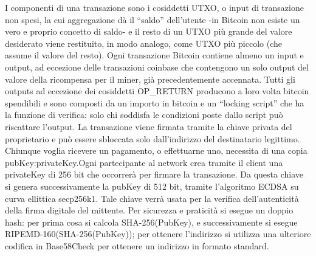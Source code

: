 \begin{table}[ht]
	\centering
\caption{Struttura dell'header di una transazione Bitcoin (Mastering Bitcoin)}
\end{table}


I componenti di una transazione sono i cosiddetti UTXO, o input di transazione non spesi, la cui aggregazione dà il “saldo” dell’utente -in Bitcoin non esiste un vero e proprio concetto di saldo- e il resto di un UTXO più grande del valore desiderato viene restituito, in modo analogo, come UTXO più piccolo (che assume il valore del resto). 
Ogni transazione Bitcoin contiene almeno un input e output, ad eccezione delle transazioni coinbase che contengono un solo output del valore della ricompensa per il miner, già precedentemente accennata. Tutti gli outputs ad eccezione dei cosiddetti OP\_RETURN producono a loro volta bitcoin spendibili e sono composti da un importo in bitcoin e un “locking script” che ha la funzione di verifica: solo chi soddisfa le condizioni poste dallo script può riscattare l’output. La transazione viene firmata tramite la chiave privata del proprietario e può essere sbloccata solo dall’indirizzo del destinatario legittimo.
Chiunque voglia ricevere un pagamento, o effettuarne uno, necessita di una copia pubKey:privateKey.Ogni partecipante al network crea tramite il client una privateKey di 256 bit che occorrerà per firmare la transazione.
Da questa chiave si genera successivamente la pubKey di 512 bit, tramite l’algoritmo ECDSA su curva ellittica secp256k1.
Tale chiave verrà usata per la verifica dell'autenticità della firma digitale del mittente.  
Per sicurezza e praticità si esegue un doppio hash: per prima cosa si calcola SHA-256(PubKey), e successivamente si esegue RIPEMD-160(SHA-256(PubKey)); per ottenere l'indirizzo si utilizza una ulteriore codifica in Base58Check per ottenere un indirizzo in formato standard.


